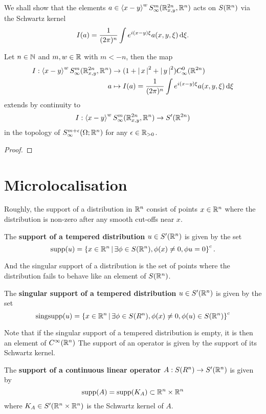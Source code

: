 \documentclass{article}
\begin{document}
We shall show that the elements $a \in \sym[x - y]^w S^{m}_\infty(\R^{2n}_{x,y}, \R^n) $ acts on $S(\R^n)$ via the Schwartz kernel 
\[
I(a) =  \frac{1}{(2\pi)^n} \int e^{i(x - y)\xi} a(x, y, \xi) \d[\xi]. 
\]
\begin{fprop}
    Let $n \in \N$ and $m, w \in \R$ with $m < -n$, then the map
    \begin{align*}
    I: \sym[x - y]^w S^{m}_\infty(\R^{2n}_{x,y}, \R^n) &\to (1 + \abs{x}^2 + \abs{y}^2) C^0_\infty(\R^{2n}) \\
    a &\mapsto I(a) = \frac{1}{(2\pi)^n} \int e^{i(x - y)\xi} a(x, y, \xi) \d[\xi]
    \end{align*}
    extends by continuity to 
    \begin{align*}
    I: \sym[x - y]^w S^{m}_\infty(\R^{2n}_{x,y}, \R^n) \to S'(\R^{2n})
    \end{align*}
    in the topology of $S^{m + \epsilon}_\infty(\Omega; \R^n)$ for any $\epsilon \in \R_{>0}$. 
\end{fprop}
\begin{proof}
    
\end{proof}


\section{Microlocalisation}
Roughly, the support of a distribution in $\R^n$ consist of points $x \in \R^n$ where the distribution is non-zero after any smooth cut-offs near $x$. 
\begin{fdefinition}
    The \textbf{support of a tempered distribution} $u \in S'(\R^n)$ is given by the set
    \[
    \supp(u) = \set{x \in \R^n \wh \exists \phi \in S(\R^n), \phi(x) \neq 0, \phi u = 0}^c. 
    \]
\end{fdefinition}

And the singular support of a distribution is the set of points where the distribution fails to behave like an element of $S(\R^n)$. 
\begin{fdefinition}
    The \textbf{singular support of a tempered distribution} $ u \in S'(\R^n)$ is given by the set 
    \[
    \mathrm{sing supp}(u) = \set{x \in \R^n \wh \exists \phi \in S(R^n), \phi(x) \neq 0, \phi(u) \in S(\R^n)}^c
    \]
\end{fdefinition}
Note that if the singular support of a tempered distribution is empty, it is then an element of $C^\infty(\R^n)$ 
The support of an operator is given by the support of its Schwartz kernel. 
\begin{fdefinition}
    The \textbf{support of a continuous linear operator} $A: S(R^n) \to S'(\R^n)$ is given by 
    \[
    \supp(A) = \supp(K_A) \subset \R^n \times \R^n
    \]
    where $K_A \in S'(\R^n \times \R^n)$ is the Schwartz kernel of $A$. 
\end{fdefinition}
\end{document}
